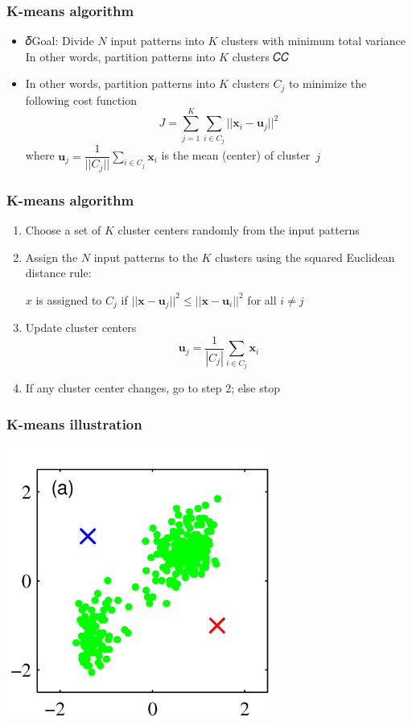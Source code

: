 \documentclass[12pt,notes,mathserif]{beamer}
\begin{document}
\begin{frame}[c]
	\frametitle{K-means algorithm}
	\begin{itemize}
		\item 𝛿Goal: Divide $N$ input patterns into $K$ clusters with minimum total variance In other words, partition patterns into $K$ clusters 𝐶𝐶
		\item In other words, partition patterns into $K$ clusters $C_j$ to minimize the following cost function
		      \[
			      J=\sum_{j=1}^K\sum_{i\in C_j} ||\mathbf{x}_i-\mathbf{u}_j||^2
		      \]
		      where $\mathbf{u}_j=\dfrac{1}{||C_j||}\sum_{i\in C_j}\mathbf{x}_i$ is  the mean (center) of cluster~$j$
	\end{itemize}
\end{frame}

\begin{frame}[c]
	\frametitle{K-means algorithm}
	\begin{enumerate}
		\item Choose a set of $K$ cluster centers randomly from the input patterns
		\item Assign the $N$ input patterns to the $K$ clusters using the squared Euclidean distance rule:

		      $x$ is assigned to $C_j$ if $||\mathbf{x}-\mathbf{u}_j||^2\le ||\mathbf{x}-\mathbf{u}_i||^2$ for all $i\neq j$
		\item Update cluster centers
		      \[
			      \mathbf{u}_j=\frac{1}{|C_j|}\sum_{i\in C_j}\mathbf{x}_i
		      \]
		\item If any cluster center changes, go to step 2; else stop
	\end{enumerate}
\end{frame}



\begin{frame}[c]
	\frametitle{K-means illustration}
	\begin{center}
		\includegraphics[width=0.65\textwidth]{fig/lec718.jpg}
	\end{center}
\end{frame}
\end{document}
